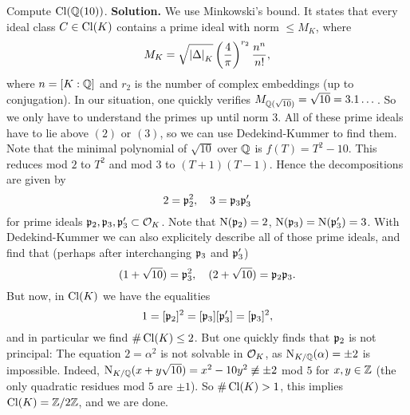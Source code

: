 \documentclass[a4paper,11pt]{article}
\begin{document}
Compute $\operatorname{Cl}(\mathbb{Q}(10))$.
\textbf{Solution.}
We use Minkowski's bound. It states that every ideal class $C \in \operatorname{Cl}(K)$
contains a prime ideal with norm $\leq M_K$, where
\begin{equation*}
    M_K = \sqrt{\left\lvert \Delta \right\rvert_K} \left(\frac{4}\pi \right)^{r_2} \frac{n^n}{n!},
\end{equation*}
where $n = [K : \mathbb{Q}]$ and $r_2$ is the number of complex embeddings (up to conjugation).
In our situation, one quickly verifies $M_{\mathbb{Q}(\sqrt {10})} = \sqrt{10} = 3.1\dots$.
So we only have to understand the primes up until norm $3$. All of these prime ideals
have to lie above $(2)$ or $(3)$, so we can use Dedekind-Kummer to find them.
Note that the minimal polynomial of $\sqrt {10}$ over $\mathbb{Q}$ is $f(T) = T^2 - 10$.
This reduces mod $2$ to $T^2$ and mod $3$ to $(T+1)(T-1)$. Hence the decompositions
are given by 
\begin{equation*}
    2 = \mathfrak{p}_2^2, \quad 3 = \mathfrak{p}_3 \mathfrak{p}_3'
\end{equation*}
for prime ideals $\mathfrak{p}_2, \mathfrak{p}_3, \mathfrak{p}_3' \subset \mathcal{O}_K$. Note that 
$\operatorname{N}(\mathfrak{p}_2) = 2$, $\operatorname{N}(\mathfrak{p}_3) = \operatorname{N}(\mathfrak{p}_3') = 3$. 
With Dedekind-Kummer we can also explicitely describe all of those prime ideals,
and find that (perhaps after interchanging $\mathfrak{p}_3$ and $\mathfrak{p}_3'$)
\begin{equation*}
    (1 + \sqrt {10}) = \mathfrak{p}_3^2, \quad (2 + \sqrt{10}) = \mathfrak{p}_2 \mathfrak{p}_3.
\end{equation*}
But now, in $\operatorname{Cl}(K)$ we have the equalities
\begin{equation*}
    1 = [\mathfrak{p}_2]^2 = [\mathfrak{p}_3][\mathfrak{p}_3'] = [\mathfrak{p}_3]^2,
\end{equation*}
and in particular we find $\#\operatorname{Cl}(K) \leq 2$. But one quickly finds that $\mathfrak{p}_2$ is 
not principal: The equation $2 = \alpha^2$ is not solvable in $\mathcal{O}_K$, as
$\operatorname{N}_{K/\mathbb{Q}}(\alpha) = \pm 2$ is impossible. Indeed, $\operatorname{N}_{K/\mathbb{Q}}(x + y\sqrt{10}) = 
x^2 - 10y^2 \not \equiv \pm 2$ mod $5$  for $x,y \in \mathbb{Z}$ (the only quadratic 
residues mod $5$ are $\pm 1$). So $\# \operatorname{Cl}(K) >1$, this implies $\operatorname{Cl}(K) = \mathbb{Z}/2\mathbb{Z}$, and
we are done.
\end{document}
